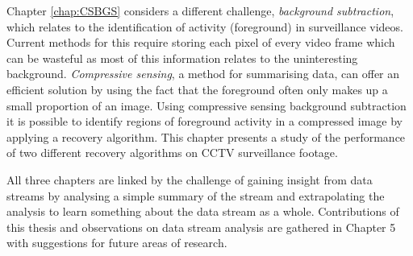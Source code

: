 Chapter \ref{chap:CSBGS} considers a different challenge, \textit{background subtraction}, which relates to the identification of activity (foreground) in surveillance videos. Current methods for this require storing each pixel of every video frame which can be wasteful as most of this information relates to the uninteresting background. \textit{Compressive sensing}, a method for summarising data, can offer an efficient solution by using the fact that the foreground often only makes up a small proportion of an image. Using compressive sensing background subtraction it is possible to identify regions of foreground activity in a compressed image by applying a recovery algorithm. This chapter presents a study of the performance of two different recovery algorithms on CCTV surveillance footage. %




%

All three chapters are linked by the challenge of gaining insight from data streams by analysing a simple summary of the stream and extrapolating the analysis to learn something about the data stream as a whole. Contributions of this thesis and observations on data stream analysis are gathered in Chapter 5  with suggestions for future areas of research.

